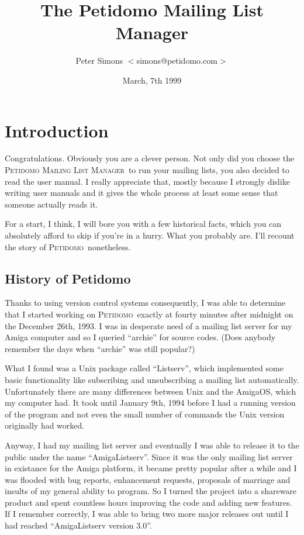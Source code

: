 \documentclass[a4paper,10pt]{scrreprt}
\newcommand{\PetidomoM}{{\scshape Peti\-domo Mail\-ing List Ma\-nager}}
\newcommand{\Petidomo}{{\scshape Peti\-domo}}
\begin{document}
%
%
\title{The Petidomo Mailing List Manager}
\author{Peter Simons $<$simons@petidomo.com$>$}
\date{March, 7th 1999}
\maketitle

%
%
\tableofcontents
\clearpage

%
%
\chapter{Introduction}

Congratulations. Obviously you are a clever person. Not only
did you choose the \PetidomoM\ to run your mailing lists, you also
decided to read the user manual. I really appreciate that, mostly
because I strongly dislike writing user manuals and it gives the whole
process at least some sense that someone actually reads it.

For a start, I think, I will bore you with a few historical facts,
which you can absolutely afford to skip if you're in a hurry. What you
probably are. I'll recount the story of \Petidomo\ nonetheless.

\section{History of Petidomo}

Thanks to using version control systems consequently, I was able to
determine that I started working on \Petidomo\ exactly at fourty
minutes after midnight on the December 26th, 1993. I was in desperate
need of a mailing list server for my Amiga computer and so I queried
``archie'' for source codes. (Does anybody remember the days when
``archie'' was still popular?)

What I found was a Unix package called ``Listserv'', which implemented
some basic functionality like subscribing and unsubscribing a mailing
list automatically. Unfortunately there are many differences between
Unix and the AmigaOS, which my computer had. It took until January
9th, 1994 before I had a running version of the program and not even
the small number of commands the Unix version originally had worked.

Anyway, I had my mailing list server and eventually I was able to
release it to the public under the name ``AmigaListserv''. Since it
was the only mailing list server in existance for the Amiga platform,
it became pretty popular after a while and I was flooded with bug
reports, enhancement requests, proposals of marriage and insults of my
general ability to program. So I turned the project into a shareware
product and spent countless hours improving the code and adding new
features. If I remember correctly, I was able to bring two more major
releases out until I had reached ``AmigaListserv version 3.0''.
\end{document}
